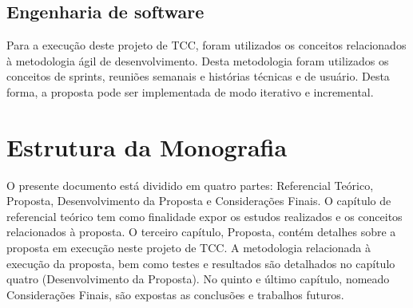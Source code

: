 \subsection{Engenharia de software}

Para a execução deste projeto de TCC, foram utilizados os conceitos relacionados à metodologia ágil de desenvolvimento. Desta metodologia foram utilizados os conceitos de sprints, reuniões semanais e histórias técnicas e de usuário. Desta forma, a proposta pode ser implementada de modo iterativo e incremental.

\section{Estrutura da Monografia}
O presente documento está dividido em quatro partes: Referencial Teórico, Proposta, Desenvolvimento da Proposta e Considerações Finais. O capítulo de referencial teórico tem como finalidade expor os estudos realizados e os conceitos relacionados à proposta. O terceiro capítulo, Proposta, contém detalhes sobre a proposta em execução neste projeto de TCC. A metodologia relacionada à execução da proposta, bem como testes e resultados são detalhados no capítulo quatro (Desenvolvimento da Proposta). No quinto e último capítulo, nomeado Considerações Finais, são expostas as conclusões e trabalhos futuros.